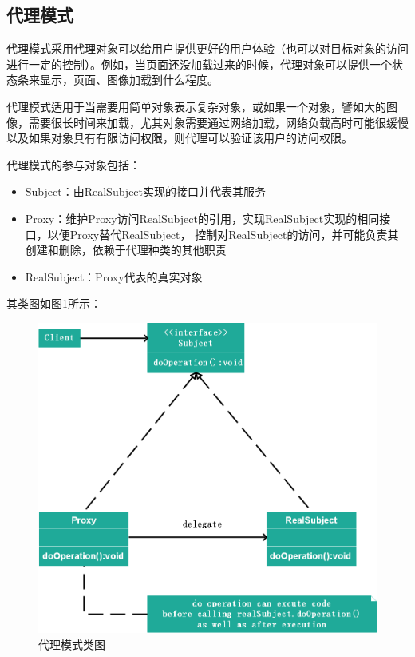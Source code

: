 \documentclass[article]{BJTU-thesis}
\begin{document}
\subsection{代理模式}

代理模式采用代理对象可以给用户提供更好的用户体验（也可以对目标对象的访问进行一定的控制）。例如，当页面还没加载过来的时候，代理对象可以提供一个状态条来显示，页面、图像加载到什么程度。

代理模式适用于当需要用简单对象表示复杂对象，或如果一个对象，譬如大的图像，需要很长时间来加载，尤其对象需要通过网络加载，网络负载高时可能很缓慢以及如果对象具有有限访问权限，则代理可以验证该用户的访问权限。

代理模式的参与对象包括：
\begin{itemize}
	\item Subject：由RealSubject实现的接口并代表其服务
	\item Proxy：维护Proxy访问RealSubject的引用，实现RealSubject实现的相同接口，以便Proxy替代RealSubject，	控制对RealSubject的访问，并可能负责其创建和删除，依赖于代理种类的其他职责
	\item RealSubject：Proxy代表的真实对象
	\end{itemize}
其类图如图\ref{fig:fig8}所示：
\begin{figure}[!htbp]
	\centering
	\includegraphics[scale=0.5]{18.png}
	\caption{代理模式类图}
	\label{fig:fig8}
\end{figure}
\end{document}

